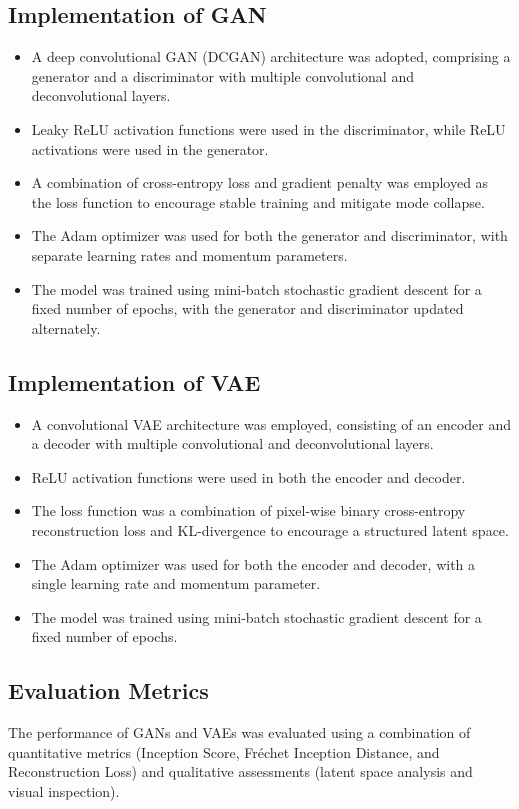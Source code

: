 \documentclass{article}
\begin{document}
\subsection{Implementation of GAN}
\begin{itemize}
    \item A deep convolutional GAN (DCGAN) architecture was adopted, comprising a generator and a discriminator with multiple convolutional and deconvolutional layers.
    \item Leaky ReLU activation functions were used in the discriminator, while ReLU activations were used in the generator.
    \item A combination of cross-entropy loss and gradient penalty was employed as the loss function to encourage stable training and mitigate mode collapse.
    \item The Adam optimizer was used for both the generator and discriminator, with separate learning rates and momentum parameters.
    \item The model was trained using mini-batch stochastic gradient descent for a fixed number of epochs, with the generator and discriminator updated alternately.
\end{itemize}

\subsection{Implementation of VAE}
\begin{itemize}
    \item A convolutional VAE architecture was employed, consisting of an encoder and a decoder with multiple convolutional and deconvolutional layers.
    \item ReLU activation functions were used in both the encoder and decoder.
    \item The loss function was a combination of pixel-wise binary cross-entropy reconstruction loss and KL-divergence to encourage a structured latent space.
    \item The Adam optimizer was used for both the encoder and decoder, with a single learning rate and momentum parameter.
    \item The model was trained using mini-batch stochastic gradient descent for a fixed number of epochs.
\end{itemize}

\subsection{Evaluation Metrics}
The performance of GANs and VAEs was evaluated using a combination of quantitative metrics (Inception Score, Fréchet Inception Distance, and Reconstruction Loss) and qualitative assessments (latent space analysis and visual inspection).
\end{document}
